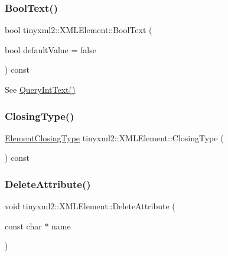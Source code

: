 \subsubsection{\texorpdfstring{Bool\+Text()}{BoolText()}}
{\footnotesize\ttfamily bool tinyxml2\+::\+X\+M\+L\+Element\+::\+Bool\+Text (\begin{DoxyParamCaption}\item[{bool}]{default\+Value = {\ttfamily false} }\end{DoxyParamCaption}) const}



See \mbox{\hyperlink{classtinyxml2_1_1_x_m_l_element_a926357996bef633cb736e1a558419632}{Query\+Int\+Text()}} 

\mbox{\label{classtinyxml2_1_1_x_m_l_element_a6965ff89557f27d4082d7043d5145555}} 
\subsubsection{\texorpdfstring{Closing\+Type()}{ClosingType()}}
{\footnotesize\ttfamily \mbox{\hyperlink{classtinyxml2_1_1_x_m_l_element_ab5f90e2493c35702175235127e2935b4}{Element\+Closing\+Type}} tinyxml2\+::\+X\+M\+L\+Element\+::\+Closing\+Type (\begin{DoxyParamCaption}{ }\end{DoxyParamCaption}) const\hspace{0.3cm}{\ttfamily [inline]}}

\mbox{\label{classtinyxml2_1_1_x_m_l_element_aebd45aa7118964c30b32fe12e944628a}} 
\subsubsection{\texorpdfstring{Delete\+Attribute()}{DeleteAttribute()}}
{\footnotesize\ttfamily void tinyxml2\+::\+X\+M\+L\+Element\+::\+Delete\+Attribute (\begin{DoxyParamCaption}\item[{const char $\ast$}]{name }\end{DoxyParamCaption})}

